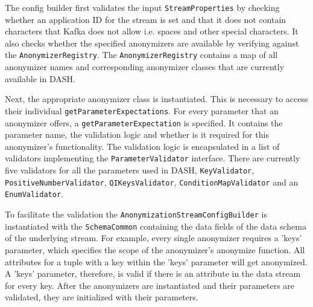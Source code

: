 The config builder first validates the input \texttt{StreamProperties} by checking whether an application ID for the stream is set and that it does not contain characters that Kafka does not allow i.e. spaces and other special characters. It also checks whether the specified anonymizers are available by verifying against the \texttt{AnonymizerRegistry}. The \texttt{AnonymizerRegistry} contains a map of all anonymizer names and corresponding anonymizer classes that are currently available in \ac{DASH}. \par
Next, the appropriate anonymizer class is instantiated. This is necessary to access their individual \texttt{getParameterExpectations}. For every parameter that an anonymizer offers, a \texttt{getParameterExpectation} is specified. It contains the parameter name, the validation logic and whether is it required for this anonymizer's functionality. The validation logic is encapsulated in a list of validators implementing the \texttt{ParameterValidator} interface. There are currently five validators for all the parameters used in \ac{DASH}, \texttt{KeyValidator}, \texttt{PositiveNumberValidator}, \texttt{QIKeysValidator}, \texttt{ConditionMapValidator} and an \texttt{EnumValidator}. \par 
To facilitate the validation the \texttt{AnonymizationStreamConfigBuilder} is instantiated with the \texttt{SchemaCommon} containing the data fields of the data schema of the underlying stream. For example, every single anonymizer requires a 'keys' parameter, which specifies the scope of the anonymizer's anonymize function. All attributes for a tuple with a key within the 'keys' parameter will get anonymized. A 'keys' parameter, therefore, is valid if there is an attribute in the data stream for every key. After the anonymizers are instantiated and their parameters are validated, they are initialized with their parameters. 

